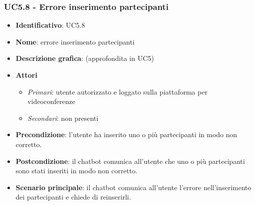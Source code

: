 \subsubsection{UC5.8 - Errore inserimento partecipanti}
\begin{itemize}
    \item \textbf{Identificativo}: UC5.8
    \item \textbf{Nome}: errore inserimento partecipanti
    \item \textbf{Descrizione grafica}: (approfondita in UC5)
    \item \textbf{Attori}
 \begin{itemize} 
    \item \textit{Primari}: utente autorizzato e loggato sulla piattaforma per videoconferenze
    \item \textit{Secondari}: non presenti
 \end{itemize}
 \item \textbf{Precondizione}: l'utente ha inserito uno o più partecipanti in modo non corretto.
 \item \textbf{Postcondizione}: il chatbot comunica all'utente che uno o più partecipanti sono stati inseriti in modo non corretto.
 \item \textbf{Scenario principale}: il chatbot comunica all'utente l'errore nell'inserimento dei partecipanti e chiede di reinserirli.
\end{itemize}
\newpage